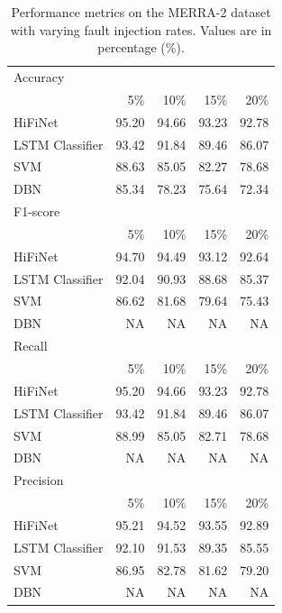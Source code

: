 \begin{table}[H]
\centering
\label{tab:merra2_results}
\begin{tabular*}{\textwidth}{@{\extracolsep{\fill}}lrrrr}
\hline
\multicolumn{5}{l}{Accuracy} \\
& 5\% & 10\% & 15\% & 20\% \\
\hline
HiFiNet & 95.20 & 94.66 & 93.23 & 92.78 \\
LSTM Classifier & 93.42 & 91.84 & 89.46 & 86.07 \\
SVM & 88.63 & 85.05 & 82.27 & 78.68 \\
DBN & 85.34 & 78.23 & 75.64 & 72.34 \\
\hline
\multicolumn{5}{l}{F1-score} \\
& 5\% & 10\% & 15\% & 20\% \\
\hline
HiFiNet & 94.70 & 94.49 & 93.12 & 92.64 \\
LSTM Classifier & 92.04 & 90.93 & 88.68 & 85.37 \\
SVM & 86.62 & 81.68 & 79.64 & 75.43 \\
DBN & NA & NA & NA & NA \\
\hline
\multicolumn{5}{l}{Recall} \\
& 5\% & 10\% & 15\% & 20\% \\
\hline
HiFiNet & 95.20 & 94.66 & 93.23 & 92.78 \\
LSTM Classifier & 93.42 & 91.84 & 89.46 & 86.07 \\
SVM & 88.99 & 85.05 & 82.71 & 78.68 \\
DBN & NA & NA & NA & NA \\
\hline
\multicolumn{5}{l}{Precision} \\
& 5\% & 10\% & 15\% & 20\% \\
\hline
HiFiNet & 95.21 & 94.52 & 93.55 & 92.89 \\
LSTM Classifier & 92.10 & 91.53 & 89.35 & 85.55 \\
SVM & 86.95 & 82.78 & 81.62 & 79.20 \\
DBN & NA & NA & NA & NA \\
\hline
\end{tabular*}
\caption{Performance metrics on the MERRA-2 dataset with varying fault injection rates. Values are in percentage (\%).}
\end{table}


